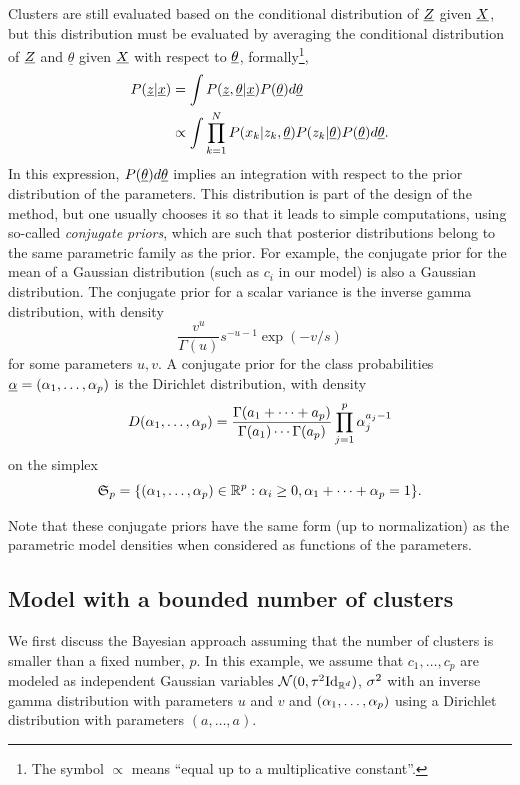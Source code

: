 Clusters are still evaluated based on the conditional distribution of ${\underline{Z}}$ given ${\underline{X}}$, but this distribution must be evaluated by averaging the conditional distribution of ${\underline{Z}}$ and $\underline\theta$ given ${\underline{X}}$ with respect to $\underline {\theta}$, formally\footnote{The symbol $\propto$ means ``equal up to a multiplicative constant''.},
\begin{align*}
P({\underline{z}}|{\underline{x}}) &= \int P({\underline{z}}, \underline{\theta}|{\underline{x}}) P(\underline{\theta}) d\underline{\theta}\\
 &\propto \int \prod_{k=1}^N P(x_k|z_k, \underline{\theta}) P(z_k|\underline{\theta}) P(\underline{\theta})d\underline{\theta}.
\end{align*}
In this expression, $P(\underline{\theta})d\underline{\theta}$ implies an integration with respect to the prior distribution of the parameters. This distribution is part of the design of the method, but one usually chooses it so that it leads to simple computations, using so-called {\em conjugate priors}, which are such that posterior distributions belong to the same parametric family as the prior.  For example, the conjugate prior for the mean of a Gaussian distribution (such as $c_i$ in our model) is also a Gaussian distribution. The conjugate prior for a  scalar variance is the inverse gamma distribution, with density  
\[
\frac{v^u}{\Gamma(u)} s^{-u-1}\exp(-v/s)
\]
for some parameters $u,v$. A conjugate prior for the class probabilities $\underline \alpha = (\alpha_1, \ldots, \alpha_p)$ is the Dirichlet distribution, with density
\[
D(\alpha_1, \ldots, \alpha_p) = \frac{\Gamma(a_1+\cdots + a_p)}{\Gamma(a_1) \cdots \Gamma(a_p)} \prod_{j=1}^p \alpha_j^{a_j-1}
\]
on the simplex 
\[
\mathfrak S_p = \{(\alpha_1, \ldots, \alpha_p)\in {\mathbb{R}}^p: \alpha_i \geq 0, \alpha_1+\cdots+\alpha_p=1\}.
\]


Note that these conjugate priors have the same form (up to normalization) as the parametric model densities when considered as functions of the parameters. 

\subsection{Model with a bounded number of clusters}
We first discuss the Bayesian approach assuming that the number of clusters is smaller than a fixed number, $p$. 
In this example, we assume  that $c_1, \ldots, c_p$ are modeled as independent Gaussian variables $\CN(0, \tau^2 \Id_{\mR^d})$, $\sigma^2$ with an inverse gamma distribution with parameters $u$ and $v$ and $(\alpha_1, \ldots, \alpha_p)$ using a Dirichlet distribution with parameters $(a, \ldots, a)$. 

